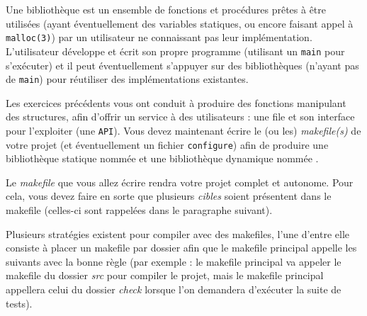 

\vspace*{0.7cm}

\noindent {}

\bigskip

\noindent Une bibliothèque est un ensemble de fonctions et procédures prêtes à être utilisées (ayant éventuellement des variables statiques, ou encore faisant appel à \texttt{malloc(3)}) par un utilisateur ne connaissant pas leur implémentation.
L'utilisateur développe et écrit son propre programme (utilisant un \texttt{main} pour s'exécuter) et il peut éventuellement s'appuyer sur des bibliothèques (n'ayant pas de \texttt{main}) pour réutiliser des implémentations existantes.

\bigskip

\noindent Les exercices précédents vous ont conduit à produire des fonctions manipulant des structures, afin d'offrir un service à des utilisateurs : une file et son interface pour l'exploiter (une \texttt{API}).
Vous devez maintenant écrire le (ou les) \textit{makefile(s)} de votre projet (et éventuellement un fichier \texttt{configure}) afin de produire une bibliothèque statique nommée  et une bibliothèque dynamique nommée .

\bigskip

\noindent Le \textit{makefile} que vous allez écrire rendra votre projet complet et autonome.
Pour cela, vous devez faire en sorte que plusieurs \textit{cibles} soient présentent dans le makefile (celles-ci sont rappelées dans le paragraphe suivant).

\bigskip

\noindent Plusieurs stratégies existent pour compiler avec des makefiles, l'une d'entre elle consiste à placer un makefile par dossier afin que le makefile principal appelle les suivants avec la bonne règle (par exemple : le makefile principal va appeler le makefile du dossier \textit{src} pour compiler le projet, mais le makefile principal appellera celui du dossier \textit{check} lorsque l'on demandera d'exécuter la suite de tests).

